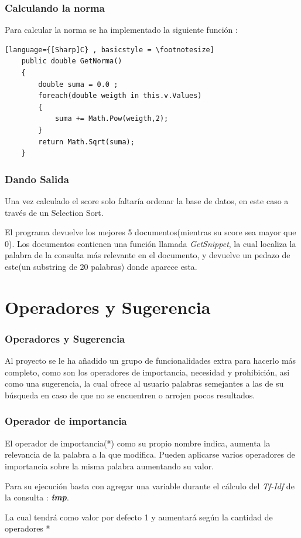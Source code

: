 \documentclass{beamer}
\begin{document}
\begin{frame}[fragile]
    \frametitle{Calculando la norma}
    Para calcular la norma se ha implementado la siguiente función :

    \begin{lstlisting}[language={[Sharp]C} , basicstyle = \footnotesize]
    public double GetNorma()
    {
        double suma = 0.0 ;
        foreach(double weigth in this.v.Values)
        {
            suma += Math.Pow(weigth,2);            
        }
        return Math.Sqrt(suma);
    }
    \end{lstlisting}
\end{frame}

\begin{frame}
    \frametitle{Dando Salida}
    Una vez calculado el score solo faltaría ordenar la base de datos, en este caso a través de un Selection Sort.

    El programa devuelve los mejores 5 documentos(mientras su score sea mayor que 0). Los documentos contienen una función
    llamada \textit{GetSnippet}, la cual localiza la palabra de la consulta más relevante en el documento, y devuelve un pedazo
    de este(un substring de 20 palabras) donde aparece esta.

\end{frame}
\section{Operadores y Sugerencia}
\begin{frame}
    \frametitle{Operadores y Sugerencia}
    Al proyecto se le ha añadido un grupo de funcionalidades extra para hacerlo más completo, como son
    los operadores de importancia, necesidad y prohibición, asi como una sugerencia, la cual ofrece al usuario
    palabras semejantes a las de su búsqueda en caso de que no se encuentren o arrojen pocos resultados.
\end{frame}

\begin{frame}
    \frametitle{Operador de importancia}
    El operador de importancia(*) como su propio nombre indica, aumenta la relevancia de la palabra a la que modifica. Pueden 
    aplicarse varios operadores de importancia sobre la misma palabra aumentando su valor.

    Para su ejecución basta con agregar una variable durante el cálculo del \textit{Tf-Idf} de la consulta : \textit{\textbf{imp}}.

    La cual tendrá como valor por defecto 1 y aumentará según la cantidad de operadores *
\end{frame}
\end{document}
